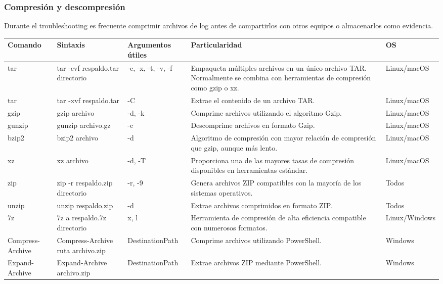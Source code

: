 \documentclass[a4paper,10pt]{article}
\begin{document}

\subsubsection{Compresión y descompresión}

Durante el troubleshooting es frecuente comprimir archivos de log antes de
compartirlos con otros equipos o almacenarlos como evidencia.

\begin{longtable}{|p{2.8cm}|p{3.3cm}|p{4cm}|p{5.3cm}|p{1.5cm}|}

\hline
Comando &
Sintaxis &
Argumentos útiles &
Particularidad &
OS
\\
\hline
\endhead

tar &
tar -cvf respaldo.tar directorio &
-c, -x, -t, -v, -f &
Empaqueta múltiples archivos en un único archivo TAR. Normalmente se combina con herramientas de compresión como gzip o xz. &
Linux/macOS
\\
\hline

tar &
tar -xvf respaldo.tar &
-C &
Extrae el contenido de un archivo TAR. &
Linux/macOS
\\
\hline

gzip &
gzip archivo &
-d, -k &
Comprime archivos utilizando el algoritmo Gzip. &
Linux/macOS
\\
\hline

gunzip &
gunzip archivo.gz &
-c &
Descomprime archivos en formato Gzip. &
Linux/macOS
\\
\hline

bzip2 &
bzip2 archivo &
-d &
Algoritmo de compresión con mayor relación de compresión que gzip, aunque más lento. &
Linux/macOS
\\
\hline

xz &
xz archivo &
-d, -T &
Proporciona una de las mayores tasas de compresión disponibles en herramientas estándar. &
Linux/macOS
\\
\hline

zip &
zip -r respaldo.zip directorio &
-r, -9 &
Genera archivos ZIP compatibles con la mayoría de los sistemas operativos. &
Todos
\\
\hline

unzip &
unzip respaldo.zip &
-d &
Extrae archivos comprimidos en formato ZIP. &
Todos
\\
\hline

7z &
7z a respaldo.7z directorio &
x, l &
Herramienta de compresión de alta eficiencia compatible con numerosos formatos. &
Linux/Windows
\\
\hline

Compress-Archive &
Compress-Archive ruta archivo.zip &
DestinationPath &
Comprime archivos utilizando PowerShell. &
Windows
\\
\hline

Expand-Archive &
Expand-Archive archivo.zip &
DestinationPath &
Extrae archivos ZIP mediante PowerShell. &
Windows
\\
\hline

\end{longtable}
\end{document}
